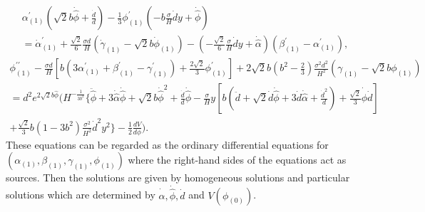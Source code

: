 \documentclass[a4paper,11pt]{article}
\begin{document}
\begin{multline}
\alpha_{(1)}^{\prime}
\left(
\sqrt{2}b\dot{\hat{\phi}}+\frac{\dot{d}}{d}
\right)
-\frac{1}{3}\phi_{(1)}^{\prime}
\left(
-b\frac{\sigma}{H}\dot{d}y+\dot{\hat{\phi}}
\right) \\
=
\dot{\alpha}_{(1)}^{\prime}
+\frac{\sqrt{2}}{6}\frac{\sigma d}{H}\left(
\dot{\gamma}_{(1)}-\sqrt{2}b\dot{\phi}_{(1)}
\right)
-\left(
-\frac{\sqrt{2}}{6}\frac{\sigma}{H}\dot{d}y+\dot{\hat{\alpha}}
\right)
\left(
\beta_{(1)}^{\prime}-\alpha_{(1)}^{\prime}
\right), 
\label{eq:yt-component}
\end{multline}
\begin{multline}
\phi_{(1)}^{\prime\prime}
-\frac{\sigma d}{H}
\left[b(3\alpha_{(1)}^{\prime}+\beta_{(1)}^{\prime}
-\gamma_{(1)}^{\prime}) +\frac{2\sqrt{2}}{3}\phi_{(1)}^{\prime} \right] 
+2\sqrt{2}b\left(b^2-\frac{2}{3}\right)\frac{\sigma^2 d^2}{H^2}
(\gamma_{(1)}-\sqrt{2}b\phi_{(1)}) \\
=d^2 e^{2\sqrt{2}b\hat{\phi}}
\Bigg( H^{-\frac{1}{3b^2}}
\Bigg\{
\ddot{\hat{\phi}}+3\dot{\hat{\alpha}}\dot{\hat{\phi}}
+\sqrt{2} b \dot{\hat{\phi}}^2 + \frac{\dot{d}}{d}\dot{\hat{\phi}} 
-\frac{\sigma}{H}y\left[b\left(
\ddot{d}+\sqrt{2}\dot{d}\dot{\hat{\phi}}
+3\dot{d}\dot{\hat{\alpha}}+\frac{\dot{d}^2}{d} \right)
+\frac{\sqrt{2}}{3}\dot{\hat{\phi}}\dot{d}
\right]  \\
+ \frac{\sqrt{2}}{3}b(1-3b^2)\frac{\sigma^2}{H^2}\dot{d}^2 y^2
\Bigg\}
-\frac{1}{2} \frac{dV}{d\phi}
\Bigg ).
\label{eq:phi}
\end{multline}
These equations can be regarded as the ordinary differential 
equations for $(\alpha_{(1)},\beta_{(1)},\gamma_{(1)},\phi_{(1)})$
where the right-hand sides of the equations act as sources. 
Then the solutions are given by homogeneous solutions and 
particular solutions which are determined by $\dot{\hat{\alpha}}, 
\dot{\hat{\phi}}, \dot{d}$ and $V(\phi_{(0)})$.

 
\end{document}
